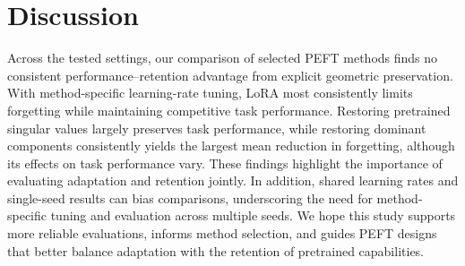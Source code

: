 \section{Discussion}
Across the tested settings, our comparison of selected PEFT methods finds no consistent performance--retention advantage from explicit geometric preservation. With method-specific learning-rate tuning, LoRA most consistently limits forgetting while maintaining competitive task performance. Restoring pretrained singular values largely preserves task performance, while restoring dominant components consistently yields the largest mean reduction in forgetting, although its effects on task performance vary. These findings highlight the importance of evaluating adaptation and retention jointly. In addition, shared learning rates and single-seed results can bias comparisons, underscoring the need for method-specific tuning and evaluation across multiple seeds. We hope this study supports more reliable evaluations, informs method selection, and guides PEFT designs that better balance adaptation with the retention of pretrained capabilities.